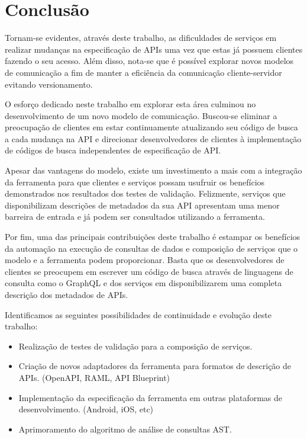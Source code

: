 \chapter{Conclusão}

Tornam-se evidentes, através deste trabalho, as dificuldades de serviços em realizar mudanças na especificação de APIs uma vez que estas já possuem clientes fazendo o seu acesso. Além disso, nota-se que é possível explorar novos modelos de comunicação a fim de manter a eficiência da comunicação cliente-servidor evitando versionamento.

O esforço dedicado neste trabalho em explorar esta área culminou no desenvolvimento de um novo modelo de comunicação. Buscou-se eliminar a preocupação de clientes em estar continuamente atualizando seu código de busca a cada mudança na API e direcionar desenvolvedores de clientes à implementação de códigos de busca independentes de especificação de API.

Apesar das vantagens do modelo, existe um investimento a mais com a integração da ferramenta para que clientes e serviços possam usufruir os benefícios demonstrados nos resultados dos testes de validação. Felizmente, serviços que disponibilizam descrições de metadados da sua API apresentam uma menor barreira de entrada e já podem ser consultados utilizando a ferramenta.

Por fim, uma das principais contribuições deste trabalho é estampar os benefícios da automação na execução de consultas de dados e composição de serviços que o modelo e a ferramenta podem proporcionar. Basta que os desenvolvedores de clientes se preocupem em escrever um código de busca através de linguagens de consulta como o GraphQL e dos serviços em disponibilizarem uma completa descrição dos metadados de APIs.



Identificamos as seguintes possibilidades de continuidade e evolução deste trabalho: 

\begin{itemize}
\item Realização de testes de validação para a composição de serviços.
\item Criação de novos adaptadores da ferramenta para formatos de descrição de APIs. (OpenAPI, RAML, API Blueprint)
\item Implementação da especificação da ferramenta em outras plataformas de desenvolvimento. (Android, iOS, etc)
\item Aprimoramento do algoritmo de análise de consultas AST.
\end{itemize}
